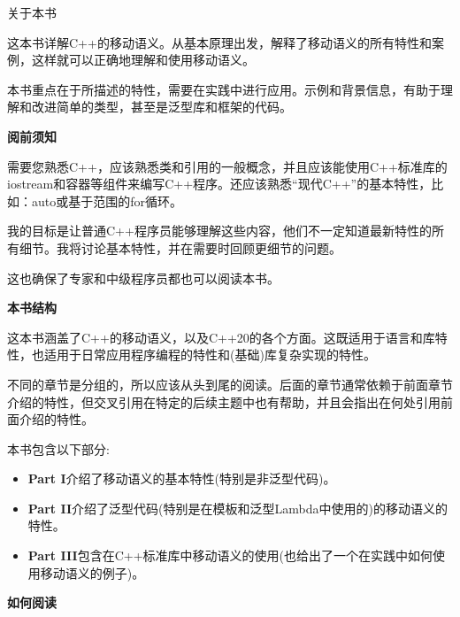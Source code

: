 \begin{flushright}
	 关于本书
\end{flushright}

这本书详解C++的移动语义。从基本原理出发，解释了移动语义的所有特性和案例，这样就可以正确地理解和使用移动语义。\par

本书重点在于所描述的特性，需要在实践中进行应用。示例和背景信息，有助于理解和改进简单的类型，甚至是泛型库和框架的代码。\par

\hspace*{\fill} \par %
\textbf{阅前须知}

需要您熟悉C++，应该熟悉类和引用的一般概念，并且应该能使用C++标准库的iostream和容器等组件来编写C++程序。还应该熟悉“现代C++”的基本特性，比如：auto或基于范围的for循环。\par

我的目标是让普通C++程序员能够理解这些内容，他们不一定知道最新特性的所有细节。我将讨论基本特性，并在需要时回顾更细节的问题。\par

这也确保了专家和中级程序员都也可以阅读本书。\par


\hspace*{\fill} \par %
\textbf{本书结构}

这本书涵盖了C++的移动语义，以及C++20的各个方面。这既适用于语言和库特性，也适用于日常应用程序编程的特性和(基础)库复杂实现的特性。\par

不同的章节是分组的，所以应该从头到尾的阅读。后面的章节通常依赖于前面章节介绍的特性，但交叉引用在特定的后续主题中也有帮助，并且会指出在何处引用前面介绍的特性。\par

本书包含以下部分:\par
\begin{itemize}
	\item \textbf{Part I}介绍了移动语义的基本特性(特别是非泛型代码)。
	\item \textbf{Part II}介绍了泛型代码(特别是在模板和泛型Lambda中使用的)的移动语义的特性。
	\item \textbf{Part III}包含在C++标准库中移动语义的使用(也给出了一个在实践中如何使用移动语义的例子)。
\end{itemize}


\hspace*{\fill} \par %
\textbf{如何阅读}

